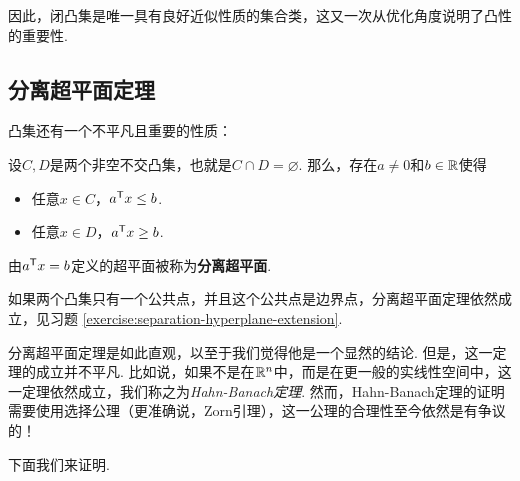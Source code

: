 因此，闭凸集是唯一具有良好近似性质的集合类，这又一次从优化角度说明了凸性的重要性.

\subsection{分离超平面定理}

凸集还有一个不平凡且重要的性质：
\begin{theorem}[分离超平面定理]\label{thm:separation-hyperplane}
设$C,D$是两个非空不交凸集，也就是$C\cap D=\varnothing$. 那么，存在$a\neq 0$和$b\in\mathbb{R}$使得
\begin{itemize}
    \item 任意$x\in C$，$a^{\mathsf{T}} x\leq b$.
    \item 任意$x\in D$，$a^{\mathsf{T}} x\geq b$.
\end{itemize}
由$a^{\mathsf{T}} x=b$定义的超平面被称为\textbf{分离超平面}.
\end{theorem}

如果两个凸集只有一个公共点，并且这个公共点是边界点，分离超平面定理依然成立，见习题 \ref{exercise:separation-hyperplane-extension}.

\begin{remark}
    分离超平面定理是如此直观，以至于我们觉得他是一个显然的结论. 但是，这一定理的成立并不平凡. 比如说，如果不是在$\mathbb{R}^n$中，而是在更一般的实线性空间中，这一定理依然成立，我们称之为\textit{Hahn-Banach定理}. 然而，Hahn-Banach定理的证明需要使用选择公理（更准确说，Zorn引理），这一公理的合理性至今依然是有争议的！
\end{remark}

下面我们来证明.

